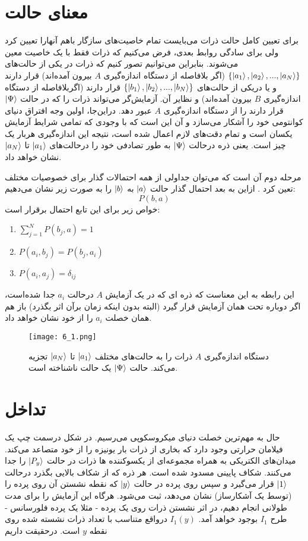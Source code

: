 \section{معنای حالت}
برای تعیین کامل حالت ذرات می‌بایست تمام خاصیت‌های سازگار باهم آنهارا تعیین کرد ولی برای سادگی روابط
بعدی، فرض می‌کنیم که ذرات فقط با یک خاصیت معین می‌شوند. بنابراین می‌توانیم تصور کنیم که ذرات در یکی از حالت‌های $\{\ket{a_{1}}, \ket{a_{2}}, ... , \ket{a_{N}}\}$ (اگر  بلافاصله از دستگاه اندازه‌گیری $A$ بیرون آمده‌اند) قرار دارند و یا دریکی از حالت‌های $\{\ket{b_{1}}, \ket{b_{2}}, ... , \ket{b_{N}}\}$  قرار دارند (اگربلافاصله از دستگاه اندازه‌گیری $B$ بیرون آمده‌اند) و نظایر آن. آزمایش‌گر می‌تواند ذرات را که در حالت $\ket{\Psi}$ قرار دارند را از دستگاه اندازه‌گیری $A$ عبور دهد. دراین‌جا، اولین وجه افتراق دنیای کوانتومی خود را آشکار می‌سازد و آن
این است که با وجودی که تمامی شرایط آزمایش یکسان است و تمام دقت‌های لازم اعمال شده است، نتیجه این اندازه‌گیری هربار یک چیز است. یعنی ذره درحالت $\ket{\Psi}$ به طور تصادفی خود را درحالت‌های $\ket{a_{1}}$ تا
 $\ket{a_{N}}$ نشان خواهد داد.

مرحله دوم آن است که می‌توان جداولی از همه احتمالات
گذار برای خصوصیات مختلف تعین کرد . ازاین به بعد احتمال گذار حالت $\ket{a}$ به $\ket{b}$ را به صورت زیر نشان می‌دهیم:
\begin{equation}
	P(b,a)
\end{equation}
خواص زیر برای این تابع احتمال برقرار است:
\begin{enumerate}
	\item $\sum_{j=1}^{N} P(b_{j},a) = 1$
	\item $P(a_{i},b_{j}) = P(b_{j},a_{i})$
	\item $P(a_{i},a_{j}) = \delta_{ij}$
\end{enumerate}
این رابطه به این معناست که ذره ای که در یک آزمایش $A$ درحالت $a_{i}$ جدا شده‌است، اگر دوباره تحت همان آزمایش قرار گیرد (البته بدون اینکه زمان برآن اثر بگذرد) باز هم همان خصلت $a_{i}$ را از خود
نشان خواهد داد.

\begin{figure}[h]
	\caption{ دستگاه اندازه‌گیری $A$ ذرات را به حالت‌های مختلف $\ket{a_{1}}$ تا $\ket{a_{N}}$ تجزیه می‌کند. حالت $\ket{\Psi}$ یک حالت ناشناخته است. }
	\centering
	\texttt{[image: 6\_1.png]}
\end{figure}

\section{تداخل}
حال به مهم‌ترین خصلت دنیای میکروسکوپی می‌رسیم. در شکل  درسمت چپ یک فیلامان حرارتی وجود دارد که بخاری از ذرات بار یونیزه را از خود متصاعد می‌کند.
 میدان‌های
الکتریکی به همراه مجموعه‌ای از یکسوکننده ها ذرات در حالت $\ket{P_{y}}$ را جدا می‌کنند. شکاف پایینی مسدود شده است.
 هر ذره
که از شکاف بالایی بگذرد درحالت $\ket{1}$ قرار می‌گیرد و سپس روی پرده در حالت ‏$\ket{y}$ که نقطه نشستن آن روی پرده را (توسط
یک آشکارساز) نشان می‌دهد، ثبت می‌شود.
 هرگاه این آزمایش را برای مدت طولانی انجام دهیم، در اثر نشستن ذرات روی
یک پرده - مثلا یک پرده فلورسانس - طرح $I_{1}$ بوجود خواهد آمد. 
$I_{1}(y)$ درواقع متناسب با تعداد ذرات نشسته شده روی نقطه $y$ است. درحقیقت داریم


